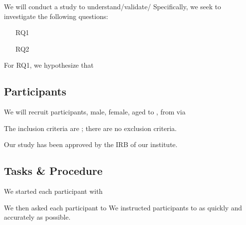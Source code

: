 % 

% 
We will conduct a \xx study to understand/validate/\xx \xx
% 
Specifically, we seek to investigate the following questions:
\begin{itemize} [leftmargin=0.25in]
    \item [RQ1] \xx
    \item [RQ2] \xx
\end{itemize}

For RQ1, we hypothesize that \xx

% 
\subsection{Participants}
We will recruit
\xx %
participants,
\xx male, \xx female, %
aged \xx to \xx, %
from \xx %
via \xx %

The inclusion criteria are \xx; %
there are no exclusion criteria. %

%
Our study has been approved by the IRB of our institute.

\subsection{Tasks \& Procedure}
We started each participant with \xx %

We then asked each participant to \xx %
% 
% 
We instructed participants to \xx as quickly and accurately as possible. %

